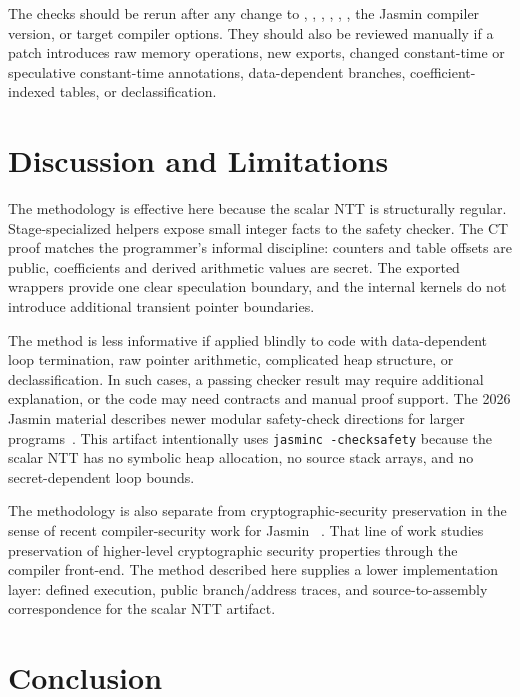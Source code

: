 \documentclass[10pt,twocolumn]{article}
\newcommand{\jasmin}{Jasmin}
\newcommand{\ct}{constant-time}
\newcommand{\sct}{speculative constant-time}
\begin{document}
The checks should be rerun after any change to ,
, , , ,
, the \jasmin{} compiler version, or target compiler options.
They should also be reviewed manually if a patch introduces raw memory
operations, new exports, changed \ct{} or \sct{} annotations, data-dependent
branches, coefficient-indexed tables, or declassification.

\section{Discussion and Limitations}

The methodology is effective here because the scalar NTT is structurally
regular.  Stage-specialized helpers expose small integer facts to the safety
checker.  The CT proof matches the programmer's informal discipline: counters
and table offsets are public, coefficients and derived arithmetic values are
secret.  The exported wrappers provide one clear speculation boundary, and the
internal kernels do not introduce additional transient pointer boundaries.

The method is less informative if applied blindly to code with data-dependent
loop termination, raw pointer arithmetic, complicated heap structure, or
declassification.  In such cases, a passing checker result may require
additional explanation, or the code may need contracts and manual proof support.
The 2026 \jasmin{} material describes newer modular safety-check directions for
larger programs~\cite{JasminFramework2026}.  This artifact intentionally uses
\texttt{jasminc -checksafety} because the scalar NTT has no symbolic heap
allocation, no source stack arrays, and no secret-dependent loop bounds.

The methodology is also separate from cryptographic-security preservation in
the sense of recent compiler-security work for \jasmin{}
~\cite{ArranzOlmos2025JasminSecurity}.  That line of work studies preservation
of higher-level cryptographic security properties through the compiler
front-end.  The method described here supplies a lower implementation layer:
defined execution, public branch/address traces, and source-to-assembly
correspondence for the scalar NTT artifact.

\section{Conclusion}
\end{document}
